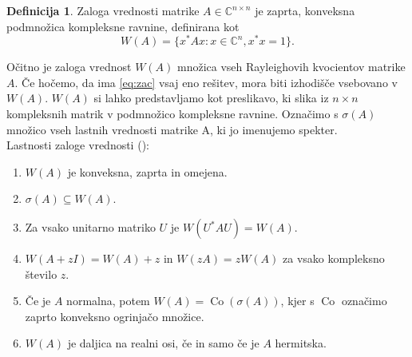\documentclass[12pt,a4paper]{amsart}
\theoremstyle{definition}
\newtheorem{definicija}{Definicija}[section]
\theoremstyle{plain}
\newcommand{\Co}{\operatorname{Co}} %
\newcommand{\C}{\mathbb C}
\begin{document}
\begin{definicija}
Zaloga vrednosti matrike $A \in \C^{n\times n}$ je zaprta, konveksna pod\-mno\-ži\-ca kompleksne ravnine, definirana kot
$$W(A)=\{x^\ast Ax: x \in \C^n, x^\ast x=1\}.$$
\end{definicija}
Očitno je zaloga vrednost $W(A)$ množica vseh Rayleighovih kvocientov matrike $A$. Če hočemo, da ima \eqref{eq:zac} vsaj eno rešitev, mora biti izhodišče vsebovano v $W(A)$. $W(A)$ si lahko predstavljamo kot preslikavo, ki slika iz $n\times n$ kompleksnih matrik v podmnožico kompleksne ravnine. Označimo s $\sigma(A)$ množico vseh lastnih vrednosti matrike A, ki jo imenujemo spekter.\\ Lastnosti zaloge vrednosti (\cite{num}):
\begin{enumerate}
\item $W(A)$ je konveksna, zaprta in omejena.
\item $\sigma(A)\subseteq W(A).$
\item Za vsako unitarno matriko $U$ je $W(U^\ast AU)=W(A).$
\item $W(A+zI)=W(A)+z$ in $W(zA)=zW(A)$ za vsako kompleksno število $z$.
\item Če je $A$ normalna, potem $W(A)=\Co(\sigma(A))$, kjer s $\Co$ označimo zaprto konveksno ogrinjačo množice.
\item $W(A)$ je daljica na realni osi, če in samo če je $A$ hermitska.
\end{enumerate}
\end{document}
